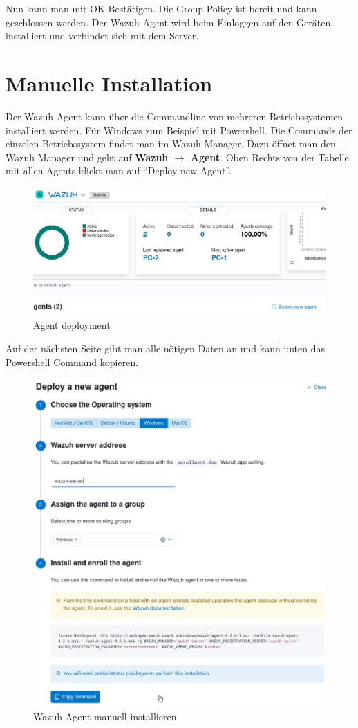 Nun kann man mit OK Bestätigen.
Die Group Policy ist bereit und kann geschlossen werden.
Der Wazuh Agent wird beim Einloggen auf den Geräten installiert und verbindet sich mit dem Server.


\section{Manuelle Installation}

Der Wazuh Agent kann über die Commandline von mehreren Betriebssystemen installiert werden.
Für Windows zum Beispiel mit Powershell.
Die Commands der einzelen Betriebssystem findet man im Wazuh Manager.
Dazu öffnet man den Wazuh Manager und geht auf \textbf{Wazuh $\rightarrow$ Agent}.
Oben Rechts von der Tabelle mit allen Agents klickt man auf ``Deploy new Agent''.
\begin{figure}[H]
    \centering
    \includegraphics[width=0.7\linewidth]{../img/agent/deploy-new-agent.png}
    \caption{Agent deployment}
\end{figure}

Auf der nächsten Seite gibt man alle nötigen Daten an und kann unten das Powershell Command kopieren.
\begin{figure}[H]
    \centering
    \includegraphics[width=0.7\linewidth]{../img/agent/deploy-new-agent-2.png}
    \caption{Wazuh Agent manuell installieren}
\end{figure}

